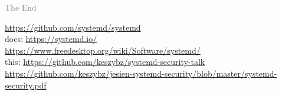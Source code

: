 \documentclass[serif]{beamer}
\begin{document}
\begin{frame}[fragile]
  \textcolor{gray}{The End}

  \bigskip

  \url{https://github.com/systemd/systemd}\\
  docs: \url{https://systemd.io/}\\
  \phantom{docs: }\url{https://www.freedesktop.org/wiki/Software/systemd/}\hspace*{-5cm}\\

  \medskip
  this: \url{https://github.com/keszybz/systemd-security-talk}\hspace*{-5cm}
  \phantom{this: }\\
  \url{https://github.com/keszybz/jesien-systemd-security/blob/master/systemd-security.pdf}
\end{frame}
\end{document}
